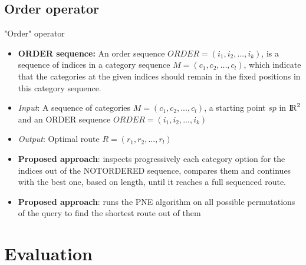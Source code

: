 \documentclass[18pt]{beamer}
\begin{document}
	\subsection{Order operator}
		\begin{frame}{"Order" operator}
		
			\begin{itemize}
				\item \textbf{ORDER sequence:} An order sequence $ORDER = (i_1, i_2, ..., i_k)$, is a sequence of indices in a category sequence $M = (c_1, c_2, ..., c_l)$, which indicate that the categories at the given indices should remain in the fixed positions in this category sequence.
				\item \textit{Input}: A sequence of categories $M = (c_1, c_2, ..., c_l)$, a starting point $sp$ in ${\rm I\!R}^2$ and an ORDER sequence $ORDER = (i_1, i_2, ..., i_k)$
				\item \textit{Output}: Optimal route $R = (r_1, r_2, ..., r_l)$ \newline
				\pause
				\item \textbf{Proposed approach}: inspects progressively each category option for the indices out of the NOTORDERED sequence, compares them and continues with the best one, based on length, until it reaches a full sequenced route.
				\item \textbf{Proposed approach}: runs the PNE algorithm on all possible permutations of the query to find the shortest route out of them
			\end{itemize}
		
		\end{frame}
	
	
\section{Evaluation}
\end{document}
